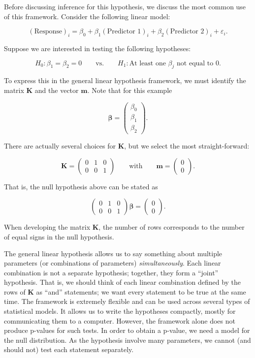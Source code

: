 \documentclass[
]{book}
\theoremstyle{plain}
\theoremstyle{mydefn}
\theoremstyle{myexmpl}
\theoremstyle{remark}
\begin{document}
Before discussing inference for this hypothesis, we discuss the most common use of this framework. Consider the following linear model:

\[(\text{Response})_i = \beta_0 + \beta_1 (\text{Predictor 1})_i + \beta_2 (\text{Predictor 2})_i + \varepsilon_i.\]

Suppose we are interested in testing the following hypotheses:

\[H_0: \beta_1 = \beta_2 = 0 \qquad \text{vs.} \qquad H_1: \text{At least one } \beta_j \text{ not equal to 0}.\]

To express this in the general linear hypothesis framework, we must identify the matrix \(\mathbf{K}\) and the vector \(\mathbf{m}\). Note that for this example

\[\boldsymbol{\beta} = \begin{pmatrix} 
\beta_0 \\
\beta_1 \\
\beta_2 \end{pmatrix}.\]

There are actually several choices for \(\mathbf{K}\), but we select the most straight-forward:

\[\mathbf{K} = \begin{pmatrix}
0 & 1 & 0 \\
0 & 0 & 1 \end{pmatrix} \qquad \text{with} \qquad \mathbf{m} = \begin{pmatrix}
0 \\ 0 \end{pmatrix}.\]

That is, the null hypothesis above can be stated as

\[\begin{pmatrix} 0 & 1 & 0 \\ 0 & 0 & 1 \end{pmatrix} \boldsymbol{\beta} = \begin{pmatrix} 0 \\ 0 \end{pmatrix}.\]

\begin{rmdtip}
When developing the matrix \(\mathbf{K}\), the number of rows corresponds to the number of equal signs in the null hypothesis.
\end{rmdtip}

The general linear hypothesis allows us to say something about multiple parameters (or combinations of parameters) \emph{simultaneously}. Each linear combination is not a separate hypothesis; together, they form a ``joint'' hypothesis. That is, we should think of each linear combination defined by the rows of \(\mathbf{K}\) as ``and'' statements; we want every statement to be true at the same time. The framework is extremely flexible and can be used across several types of statistical models. It allows us to write the hypotheses compactly, mostly for communicating them to a computer. However, the framework alone does not produce p-values for such tests. In order to obtain a p-value, we need a model for the null distribution. As the hypothesis involve many parameters, we cannot (and should not) test each statement separately.
\end{document}
